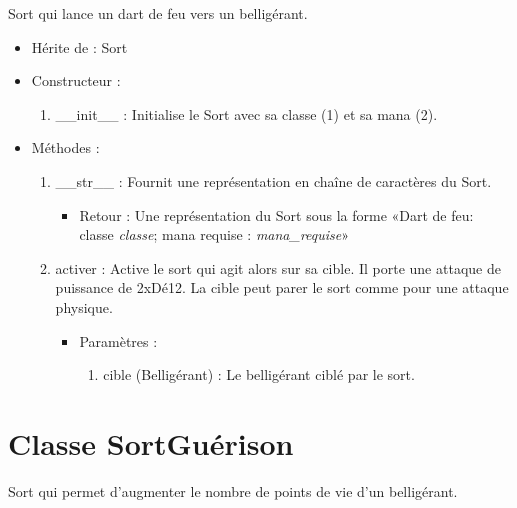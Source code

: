 \documentclass[12pt,pdftex,oneside]{article}
\begin{document}
  Sort qui lance un dart de feu vers un belligérant.

  \begin{itemize}
  \item Hérite de : Sort


  \item Constructeur : 

  \begin{enumerate}
  \item \_\_init\_\_ : Initialise le Sort avec sa classe (1) et sa mana (2).

  \end{enumerate}

  \item Méthodes : 

    \begin{enumerate}
    \item __str__ : Fournit une représentation en chaîne de caractères du Sort.
      \begin{itemize}
      \item Retour : Une représentation du Sort sous la forme «Dart de feu: classe \emph{classe}; mana requise : \emph{mana_requise}»
      \end{itemize}
    \item activer : Active le sort qui agit alors sur sa cible. Il porte une
      attaque de puissance de 2xDé12. La cible peut parer le sort comme
      pour une attaque physique.
      \begin{itemize}
      \item Paramètres : 
        \begin{enumerate}
        \item cible (Belligérant) : Le belligérant ciblé par le sort.
        \end{enumerate}
      \end{itemize}
    \end{enumerate}

  \end{itemize}

  \section {Classe SortGuérison}

  Sort qui permet d'augmenter le nombre de points de vie d'un belligérant.
\end{document}
